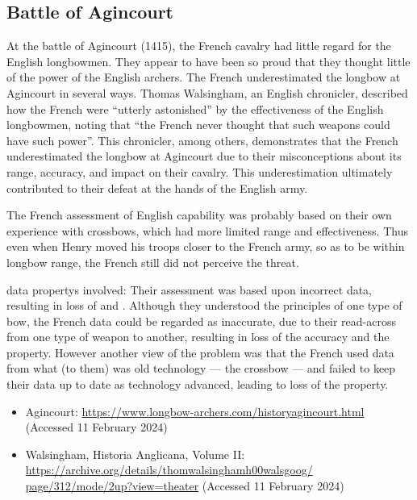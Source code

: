 \subsection{Battle of Agincourt}\label{bkm:incacc:agincourt}
  At the battle of Agincourt (1415), the French cavalry had little regard for the English longbowmen.
  They appear to have been so proud that they thought little of the power of the English
  archers.
  The French underestimated the longbow at Agincourt in several ways.
  Thomas Walsingham, an English chronicler, described how the French were ``utterly astonished''
  by the effectiveness of the English longbowmen,
  noting that ``the French never thought that such weapons could have such power''.
  This chronicler, among others, demonstrates that the French underestimated the longbow at
  Agincourt due to their misconceptions about its range, \gls{accuracy}, and impact on their cavalry.
  This underestimation ultimately contributed to their defeat at the hands of the English army.

  The French assessment of English capability was probably based on their own experience with
  crossbows, which had more limited range and effectiveness. Thus even when Henry moved his troops
  closer to the French army, so as to be within longbow range, the French still did not perceive the threat.

  \Glspl{data property} involved: Their assessment was based upon incorrect data, resulting in loss of 
   and
  .
  Although they understood the principles of one type of bow, the French data could be regarded as
  inaccurate, due to their read-across from one type of weapon to another, resulting in loss of the
  \gls{accuracy} and the
   property.
  However another view of the problem was that the French used data from what (to them) was old
  technology --- the crossbow --- and failed to keep their data up to date as technology advanced,
  leading to loss of the
   property.

  \begin{itemize}
  \item Agincourt:
  \href{https://www.longbow-archers.com/historyagincourt.html}
       {https://www.longbow-archers.com/historyagincourt.html}
       (Accessed 11 February 2024)
  \item Walsingham, Historia Anglicana, Volume II:
  \href{https://archive.org/details/thomwalsinghamh00walsgoog/page/312/mode/2up?view=theater}
       {https://archive.org/details/thomwalsinghamh00walsgoog/ page/312/mode/2up?view=theater}
       (Accessed 11 February 2024)

\end{itemize}


